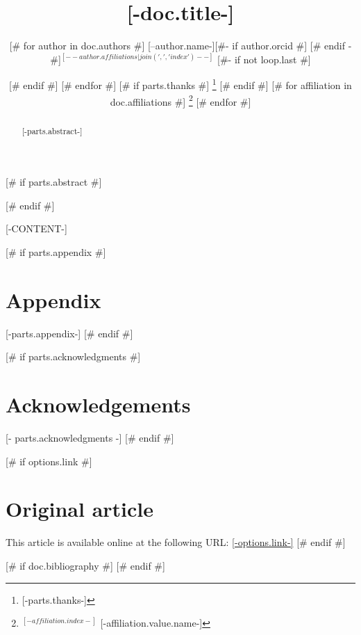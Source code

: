 \documentclass[letterpaper, 10 pt, conference]{ieeeconf}  %
\title{[-doc.title-]}
\author{
[# for author in doc.authors #]
	[--author.name-][#- if author.orcid #] \orcidlink{[- author.orcid -]} [# endif -#]$^{{[--author.affiliations|join(', ', 'index')--]}}$
	[#- if not loop.last #] \and [# endif #]
[# endfor #] %
[# if parts.thanks #]
\thanks{
[-parts.thanks-]
}
[# endif #]
[# for affiliation in doc.affiliations #]
\thanks{
$^{{[-affiliation.index-]}}$ {[-affiliation.value.name-]}
} %
[# endfor #]
}
\begin{document}
\maketitle



[# if parts.abstract #]
\begin{abstract}
[-parts.abstract-]\\
\end{abstract}
[# endif #]



[-CONTENT-]


[# if parts.appendix #]
\clearpage
\section*{Appendix}
[-parts.appendix-]
[# endif #]

[# if parts.acknowledgments #]
\section*{Acknowledgements}
\footnotesize
[- parts.acknowledgments -]
\normalsize
[# endif #]

[# if options.link #]
\section*{Original article}
\footnotesize
This article is available online at the following URL: \href{[-options.link-]}{[-options.link-]}
\normalsize
[# endif #]

[# if doc.bibliography #]
{\small
\printbibliography
}
[# endif #]
\end{document}
